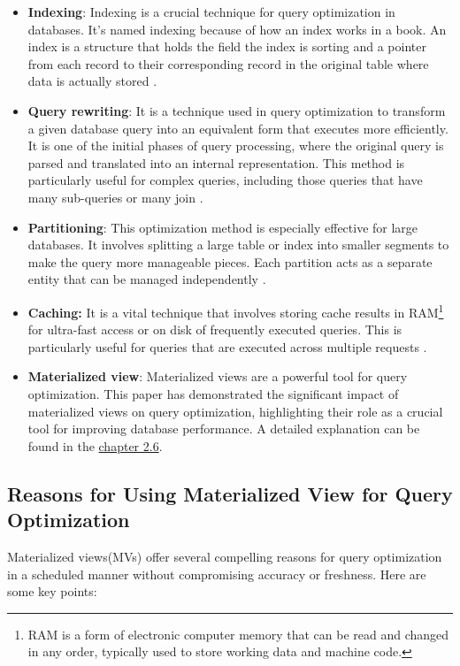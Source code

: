  \begin{itemize}
     \item \textbf{Indexing}: Indexing is a crucial technique for query optimization in databases. It's named indexing because of how an index works in a book. An index is a structure that holds the field the index is sorting and a pointer from each record to their corresponding record in the original table where data is actually stored \cite{tomar-2021,atlassian-no-date}.
     \item \textbf{Query rewriting}: It is a technique used in query optimization to transform a given database query into an equivalent form that executes more efficiently. It is one of the initial phases of query processing, where the original query is parsed and translated into an internal representation. This method is particularly useful for complex queries, including those queries that have many sub-queries or many join \cite{pitoura-2009,unknown-IBM-25-2024}.
     
     \item \textbf{Partitioning}: This optimization method is especially effective for large databases. It involves splitting a large table or index into smaller segments to make the query more manageable pieces. Each partition acts as a separate entity that can be managed independently \cite{planck-2024}.
     
     \item \textbf{Caching:} It is a vital technique that involves storing cache results in RAM\footnote{ RAM is a form of electronic computer memory that can be read and changed in any order, typically used to store working data and machine code.} for ultra-fast access or on disk of frequently executed queries. This is particularly useful for queries that are executed across multiple requests \cite{Bit-Fetch-2024}.
     
     \item\textbf{Materialized view}: Materialized views are a powerful tool for query optimization. This paper has demonstrated the significant impact of materialized views on query optimization, highlighting their role as a crucial tool for improving database performance. A detailed explanation can be found in the \hyperref[term:materialized_views]{chapter 2.6}.\vspace{.4cm}
     
 \end{itemize}
 
 \subsection{Reasons for Using Materialized View for Query Optimization}
 Materialized views(MVs) offer several compelling reasons for query optimization in a scheduled manner without compromising accuracy or freshness. Here are some key points:
 
